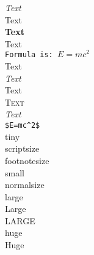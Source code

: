 \documentclass[12pt,a4paper]{article}
\begin{document}
\noindent
\Huge
\emph{Text}\\
\textrm{Text}\\
\textbf{Text}\\
\textsf{Text}\\
\texttt{Formula is: $E=mc^2$}\\
\textmd{Text}\\
\textit{Text}\\
\textup{Text}\\
\textsc{Text}\\
\textsl{Text}\\
\verb"$E=mc^2$"\\


\noindent
{\tiny tiny}\\
{\scriptsize scriptsize}\\
{\footnotesize footnotesize}\\
{\small small}\\
{\normalsize normalsize}\\
{\large large}\\
{\Large Large}\\
{\LARGE LARGE}\\
{\huge huge}\\
{\Huge Huge}
\end{document}
